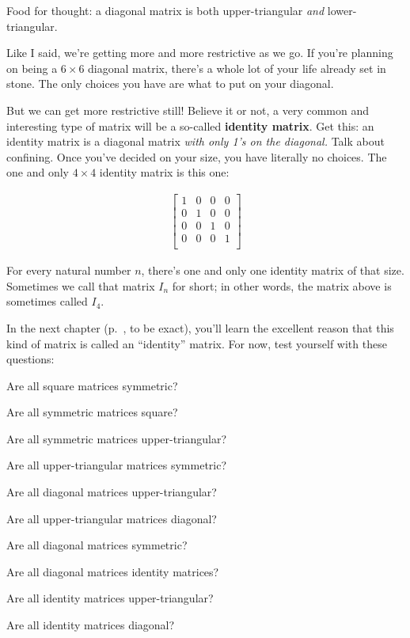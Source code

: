 Food for thought: a diagonal matrix is both upper-triangular \textit{and}
lower-triangular.

Like I said, we're getting more and more restrictive as we go. If you're
planning on being a $6\times 6$ diagonal matrix, there's a whole lot of your
life already set in stone. The only choices you have are what to put on your
diagonal.

\medskip

\label{identityMatrix}

But we can get more restrictive still! Believe it or not, a very common and
interesting type of matrix will be a so-called \textbf{identity matrix}. Get
this: an identity matrix is a diagonal matrix \textit{with only 1's on the
diagonal.} Talk about confining. Once you've decided on your size, you have
literally no choices. The one and only $4\times 4$ identity matrix is this one:

\vspace{-.15in}
\begin{align*}
\begin{bmatrix}
1 & 0 & 0 & 0\\
0 & 1 & 0 & 0\\
0 & 0 & 1 & 0 \\
0 & 0 & 0 & 1 \\
\end{bmatrix}
\end{align*}
\vspace{-.15in}

For every natural number $n$, there's one and only one identity matrix of that
size. Sometimes we call that matrix $I_n$ for short; in other words, the matrix
above is sometimes called $I_4$. 

In the next chapter (p.~\pageref{identityMatrixExplanation}, to be exact),
you'll learn the excellent reason that this kind of matrix is called an
``identity'' matrix. For now, test yourself with these questions:

\begin{compactenum}
\label{specialMatrixQuiz}
\item Are all square matrices symmetric?
\item Are all symmetric matrices square?
\item Are all symmetric matrices upper-triangular?
\item Are all upper-triangular matrices symmetric?
\item Are all diagonal matrices upper-triangular?
\item Are all upper-triangular matrices diagonal?
\item Are all diagonal matrices symmetric?
\item Are all diagonal matrices identity matrices?
\item Are all identity matrices upper-triangular?
\item Are all identity matrices diagonal?
\end{compactenum}

